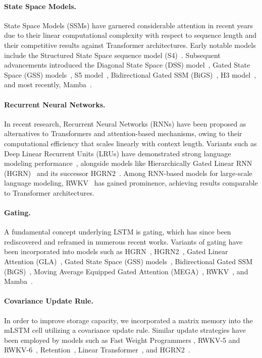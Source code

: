 \paragraph{State Space Models.} State Space Models (SSMs) have garnered considerable attention in recent years due to their linear computational complexity with respect to sequence length and their competitive results against Transformer architectures. Early notable models include the Structured State Space sequence model (S4)~\citep{Gu:21}. Subsequent advancements introduced the Diagonal State Space (DSS) model~\citep{Gupta:22}, Gated State Space (GSS) models~\citep{Mehta:22}, S5 model~\citep{Smith:22}, Bidirectional Gated SSM (BiGS)~\citep{Wang:22}, H3 model~\citep{Fu:23}, and most recently, Mamba~\citep{Gu:24arxiv}.

\paragraph{Recurrent Neural Networks.} In recent research, Recurrent Neural Networks (RNNs) have been proposed as alternatives to Transformers and attention-based mechanisms, owing to their computational efficiency that scales linearly with context length. Variants such as Deep Linear Recurrent Units (LRUs) have demonstrated strong language modeling performance~\citep{Orvieto:23, De:24arxiv}, alongside models like Hierarchically Gated Linear RNN (HGRN)~\citep{Qin:23} and its successor HGRN2~\citep{Qin:24arxiv}. Among RNN-based models for large-scale language modeling, RWKV~\citep{Peng:23arxivshort,Peng:24arxivshort} has gained prominence, achieving results comparable to Transformer architectures.

\paragraph{Gating.}
A fundamental concept underlying LSTM is gating, which has since been rediscovered and reframed in numerous recent works. Variants of gating have been incorporated into models such as HGRN~\citep{Qin:23}, HGRN2~\citep{Qin:24arxiv}, Gated Linear Attention (GLA)~\citep{Yang:23arxiv}, Gated State Space (GSS) models~\citep{Mehta:22}, Bidirectional Gated SSM (BiGS)~\citep{Wang:22}, Moving Average Equipped Gated Attention (MEGA)~\citep{Ma:22}, RWKV~\citep{Peng:23arxivshort}, and Mamba~\citep{Gu:24arxiv}.

\paragraph{Covariance Update Rule.} In order to improve storage capacity, we incorporated a matrix memory into the mLSTM cell utilizing a covariance update rule. Similar update strategies have been employed by models such as Fast Weight Programmers \citep{Schmidhuber:92ncfastweights,Schlag:21}, RWKV-5 and RWKV-6~\citep{Peng:24arxivshort}, Retention~\citep{Sun:23arxiv}, Linear Transformer~\citep{Katharopoulos:20}, and HGRN2~\citep{Qin:24arxiv}.

